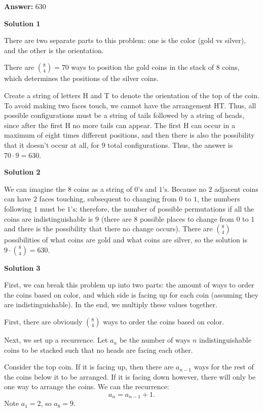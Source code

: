 \begin{enumerate}
 
 \textbf{Answer: }630



\textbf{Solution 1}

There are two separate parts to this problem: one is the color (gold vs silver), and the other is the orientation.

 There are ${8\choose4} = 70$ ways to position the gold coins in the stack of 8 coins, which determines the positions of the silver coins.

 Create a string of letters H and T to denote the orientation of the top of the coin. To avoid making two faces touch, we cannot have the arrangement HT. Thus, all possible configurations must be a string of tails followed by a string of heads, since after the first H no more tails can appear. The first H can occur in a maximum of eight times different positions, and then there is also the possibility that it doesn’t occur at all, for $9$ total configurations. Thus, the answer is $70 \cdot 9 = \boxed{630}$.

 



\textbf{Solution 2}

We can imagine the $8$ coins as a string of $0\text{'s}$ and $1\text{'s}$. Because no $2$ adjacent coins can have $2$ faces touching, subsequent to changing from $0$ to $1$, the numbers following $1$ must be $1\text{'s}$; therefore, the number of possible permutations if all the coins are indistinguishable is $9$ (there are $8$ possible places to change from $0$ to $1$ and there is the possibility that there no change occurs). There are $\binom 8 4$ possibilities of what coins are gold and what coins are silver, so the solution is $\boxed{9\cdot \binom 8 4=630}$.

 



\textbf{Solution 3}

First, we can break this problem up into two parts: the amount of ways to order the coins based on color, and which side is facing up for each coin (assuming they are indistinguishable). In the end, we multiply these values together. 

 First, there are obviously $\binom{8}{4}$ ways to order the coins based on color. 

 Next, we set up a recurrence. Let $a_n$ be the number of ways $n$ indistinguishable coins to be stacked such that no heads are facing each other. 

 Consider the top coin. If it is facing up, then there are $a_{n-1}$ ways for the rest of the coins below it to be arranged. If it is facing down however, there will only be one way to arrange the coins. We can the recurrence: 
 \[a_n=a_{n-1}+1.\] Note $a_1=2$, so $a_8 = 9$.


\end{enumerate}
